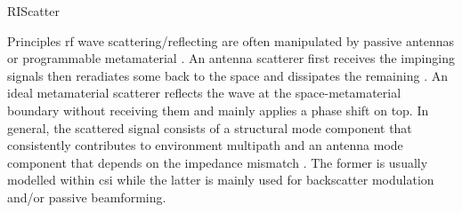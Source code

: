 \documentclass[journal]{IEEEtran}
\begin{document}
\begin{section}{RIScatter}
	\begin{subsection}{Principles}
		\gls{rf} wave scattering/reflecting are often manipulated by passive antennas or programmable metamaterial \cite{Liang2022}.
		An antenna scatterer first receives the impinging signals then reradiates some back to the space and dissipates the remaining \cite{Dobkin2012}.
		An ideal metamaterial scatterer reflects the wave at the space-metamaterial boundary without receiving them and mainly applies a phase shift on top.
		In general, the scattered signal consists of a structural mode component that consistently contributes to environment multipath and an antenna mode component that depends on the impedance mismatch \cite{Hansen1989}.
		The former is usually modelled within \gls{csi} while the latter is mainly used for backscatter modulation and/or passive beamforming.

\end{subsection}
\end{section}
\end{document}
